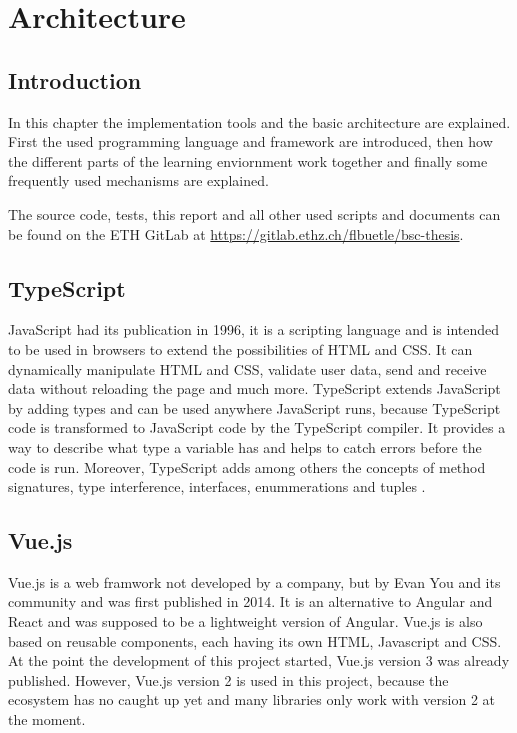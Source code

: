 \chapter{Architecture}
\label{chapter:architecture}

\section{Introduction}
\label{section:introduction}
In this chapter the implementation tools and the basic architecture are explained. First the used programming language and framework are introduced, then how the different parts of the learning enviornment work together and finally some frequently used mechanisms are explained.

The source code, tests, this report and all other used scripts and documents can be found on the ETH GitLab at \url{https://gitlab.ethz.ch/flbuetle/bsc-thesis}.

\section{TypeScript}
\label{section:typescript}
JavaScript had its publication in 1996, it is a scripting language and is intended to be used in browsers to extend the possibilities of HTML and CSS. It can dynamically manipulate HTML and CSS, validate user data, send and receive data without reloading the page and much more.
TypeScript extends JavaScript by adding types and can be used anywhere JavaScript runs, because TypeScript code is transformed to JavaScript code by the TypeScript compiler. It provides a way to describe what type a variable has and helps to catch errors before the code is run. Moreover, TypeScript adds among others the concepts of method signatures, type interference, interfaces, enummerations and tuples \cite{Typescript}.

\section{Vue.js}
\label{section:vuejs}
Vue.js is a web framwork not developed by a company, but by Evan You and its community and was first published in 2014. It is an alternative to Angular and React and was supposed to be a lightweight version of Angular. Vue.js is also based on reusable components, each having its own HTML, Javascript and CSS.
At the point the development of this project started, Vue.js version 3 was already published. However, Vue.js version 2 is used in this project, because the ecosystem has no caught up yet and many libraries only work with version 2 at the moment\cite{Vue}.

